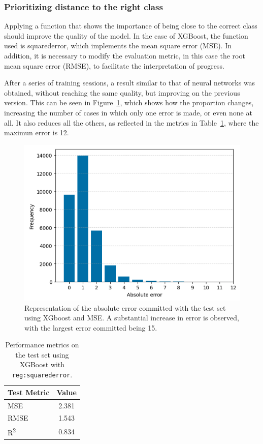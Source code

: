 \subsubsection{Prioritizing distance to the right class}

Applying a function that shows the importance of being close to the correct class should improve the quality of the model. In the case of XGBoost, the function used is squarederror, which implements the mean square error (MSE). In addition, it is necessary to modify the evaluation metric, in this case the root mean square error (RMSE), to facilitate the interpretation of progress.

After a series of training sessions, a result similar to that of neural networks was obtained, without reaching the same quality, but improving on the previous version. This can be seen in Figure~\ref{fig:barplot_xgboost_v2}, which shows how the proportion changes, increasing the number of cases in which only one error is made, or even none at all. It also reduces all the others, as reflected in the metrics in Table~\ref{tab:xgboost_classification_metrics_v2}, where the maximun error is 12.

\begin{figure}[H]
    \centering
    \includegraphics[width=1\textwidth]{figures/xgboost_class/xgboost_class_v2_mse.png}
    \caption{Representation of the absolute error committed with the test set using XGboost and MSE. A substantial increase in error is observed, with the largest error committed being 15.}
    \label{fig:barplot_xgboost_v2}
\end{figure}

\begin{table}[H]
    \centering
    \begin{tabular}{|l|c|}
    \hline
    \textbf{Test Metric} & \textbf{Value} \\
    \hline
    MSE & 2.381 \\
    RMSE & 1.543 \\
    R\textsuperscript{2} & 0.834 \\
    \hline
    \end{tabular}
    \caption{Performance metrics on the test set using XGBoost with \texttt{reg:squarederror}.}
    \label{tab:xgboost_classification_metrics_v2}
\end{table}

